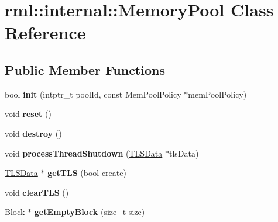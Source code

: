 \hypertarget{classrml_1_1internal_1_1MemoryPool}{}\section{rml\+:\+:internal\+:\+:Memory\+Pool Class Reference}
\label{classrml_1_1internal_1_1MemoryPool}
\subsection*{Public Member Functions}
\begin{DoxyCompactItemize}
\item 
\hypertarget{classrml_1_1internal_1_1MemoryPool_a7b9f97bc41fa9c3d5fb6d3e7bbe4180d}{}bool {\bfseries init} (intptr\+\_\+t pool\+Id, const Mem\+Pool\+Policy $\ast$mem\+Pool\+Policy)\label{classrml_1_1internal_1_1MemoryPool_a7b9f97bc41fa9c3d5fb6d3e7bbe4180d}

\item 
\hypertarget{classrml_1_1internal_1_1MemoryPool_a4aa7906b1fa0a17f6a2bfb8b33b93cd8}{}void {\bfseries reset} ()\label{classrml_1_1internal_1_1MemoryPool_a4aa7906b1fa0a17f6a2bfb8b33b93cd8}

\item 
\hypertarget{classrml_1_1internal_1_1MemoryPool_a4ab955e231ad751d8acffb7f3154f760}{}void {\bfseries destroy} ()\label{classrml_1_1internal_1_1MemoryPool_a4ab955e231ad751d8acffb7f3154f760}

\item 
\hypertarget{classrml_1_1internal_1_1MemoryPool_a2edd3408cef8a9c882aeb8ffe2e845de}{}void {\bfseries process\+Thread\+Shutdown} (\hyperlink{classrml_1_1internal_1_1TLSData}{T\+L\+S\+Data} $\ast$tls\+Data)\label{classrml_1_1internal_1_1MemoryPool_a2edd3408cef8a9c882aeb8ffe2e845de}

\item 
\hypertarget{classrml_1_1internal_1_1MemoryPool_acdf684e1b29c9d00886d97b909798488}{}\hyperlink{classrml_1_1internal_1_1TLSData}{T\+L\+S\+Data} $\ast$ {\bfseries get\+T\+L\+S} (bool create)\label{classrml_1_1internal_1_1MemoryPool_acdf684e1b29c9d00886d97b909798488}

\item 
\hypertarget{classrml_1_1internal_1_1MemoryPool_ae55f3e31dc8bce61a9e97a6a83283d12}{}void {\bfseries clear\+T\+L\+S} ()\label{classrml_1_1internal_1_1MemoryPool_ae55f3e31dc8bce61a9e97a6a83283d12}

\item 
\hypertarget{classrml_1_1internal_1_1MemoryPool_a16261e62d2c6418981ade9a7ea23d5d0}{}\hyperlink{classrml_1_1internal_1_1Block}{Block} $\ast$ {\bfseries get\+Empty\+Block} (size\+\_\+t size)\label{classrml_1_1internal_1_1MemoryPool_a16261e62d2c6418981ade9a7ea23d5d0}


\end{DoxyCompactItemize}
